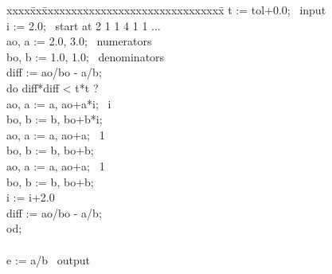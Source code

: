 \begin{tt}
\begin{tabbing}
xxxx\=xx\=xxxxxxxxxxxxxxxxxxxxxxxxxxxxxxx\=\kill
\>  t := tol+0.0;         \>\>\bq\ input                            \\
\>  i := 2.0;             \>\>\bq\ start at 2 1 1 4 1 1 ...         \\
\>  ao, a := 2.0, 3.0;                    \>\>\bq\ numerators       \\
\>  bo, b := 1.0, 1.0;                    \>\>\bq\ denominators     \\
\>  diff := ao/bo - a/b;                                            \\
\>  do diff*diff < t*t ?                                           \\
\>\>      ao, a := a, ao+a*i;                \>\bq\ i               \\
\>\>      bo, b := b, bo+b*i;                                       \\
\>\>      ao, a := a, ao+a;                  \>\bq\ 1               \\
\>\>      bo, b := b, bo+b;                                         \\
\>\>      ao, a := a, ao+a;                  \>\bq\ 1               \\
\>\>      bo, b := b, bo+b;                                         \\
\>\>      i := i+2.0                                                \\
\>\>      diff := ao/bo - a/b;                                      \\
\>  od;                                                             \\
                                                                    \\
\>  e := a/b                             \>\>\bq\ output            \\
\end{tabbing}
\end{tt}

